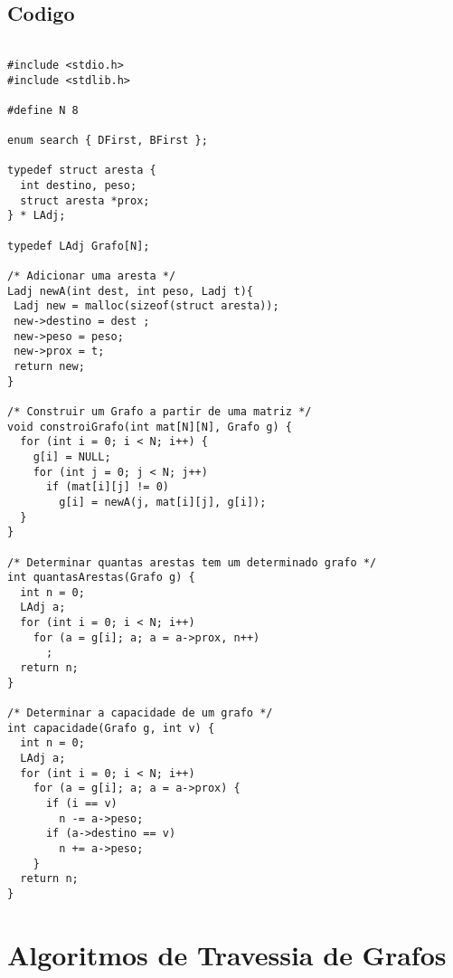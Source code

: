\documentclass[11pt]{article}
\begin{document}
\subsection{Codigo}
\label{sec:org7530d9d}
\begin{verbatim}

#include <stdio.h>
#include <stdlib.h>

#define N 8

enum search { DFirst, BFirst };

typedef struct aresta {
  int destino, peso;
  struct aresta *prox;
} * LAdj;

typedef LAdj Grafo[N];

/* Adicionar uma aresta */
Ladj newA(int dest, int peso, Ladj t){
 Ladj new = malloc(sizeof(struct aresta));
 new->destino = dest ; 
 new->peso = peso;
 new->prox = t; 
 return new;
}

/* Construir um Grafo a partir de uma matriz */
void constroiGrafo(int mat[N][N], Grafo g) {
  for (int i = 0; i < N; i++) {
    g[i] = NULL;
    for (int j = 0; j < N; j++)
      if (mat[i][j] != 0)
        g[i] = newA(j, mat[i][j], g[i]);
  }
}

/* Determinar quantas arestas tem um determinado grafo */
int quantasArestas(Grafo g) {
  int n = 0;
  LAdj a;
  for (int i = 0; i < N; i++)
    for (a = g[i]; a; a = a->prox, n++)
      ;
  return n;
}

/* Determinar a capacidade de um grafo */
int capacidade(Grafo g, int v) {
  int n = 0;
  LAdj a;
  for (int i = 0; i < N; i++)
    for (a = g[i]; a; a = a->prox) {
      if (i == v)
        n -= a->peso;
      if (a->destino == v)
        n += a->peso;
    }
  return n;
}
\end{verbatim}
\section{Algoritmos de Travessia de Grafos}
\label{sec:org364f273}
\end{document}

